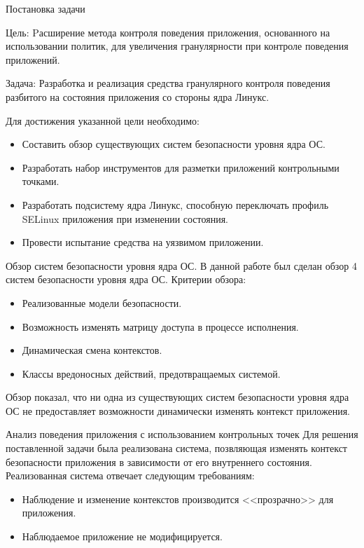 \documentclass{beamer}
\begin{document}
\begin{frame}{Постановка задачи}
 \begin{block}{Цель:}
  \small{Pасширение метода контроля поведения приложения, основанного на использовании политик, для увеличения гранулярности при контроле поведения приложений.}
 \end{block}
\begin{block}{Задача:}
\small{Разработка и реализация средства гранулярного контроля
        поведения разбитого на состояния приложения со стороны
        ядра Линукс.}
 \end{block}
 \begin{block}{Для достижения указанной цели необходимо:}
  \begin{itemize}
   \item \small{Составить обзор существующих систем безопасности уровня ядра ОС.}
   \item \small{Разработать набор инструментов для разметки
        приложений контрольными точками.}
   \item \small{Разработать подсистему ядра Линукс, способную
        переключать профиль SELinux приложения при изменении состояния.}
   \item \small{Провести испытание средства на уязвимом приложении.}
  \end{itemize}
 \end{block}
\end{frame}

\begin{frame}{Обзор систем безопасности уровня ядра ОС.}
В данной работе был сделан обзор 4 систем безопасности уровня ядра ОС.
Критерии обзора:

\begin{itemize}
 \item Реализованные модели безопасности.
 \item Возможность изменять матрицу доступа в процессе исполнения.
 \item Динамическая смена контекстов.
 \item Классы вредоносных действий, предотвращаемых системой.
\end{itemize}
 Обзор показал, что ни одна из существующих систем безопасности 
 уровня ядра ОС не предоставляет возможности динамически изменять
 контекст приложения.
 
 \end{frame}


\begin{frame}{Анализ поведения приложения с использованием контрольных точек}
Для решения поставленной задачи была реализована система,
позвляющая изменять контекст безопасности приложения в зависимости
от его внутреннего состояния.
Реализованная система отвечает следующим требованиям:
\begin{itemize}
\item Наблюдение и изменение контекстов производится
        <<прозрачно>> для приложения.
\item Наблюдаемое приложение не модифицируется.
\end{itemize}

\end{frame}
\end{document}
